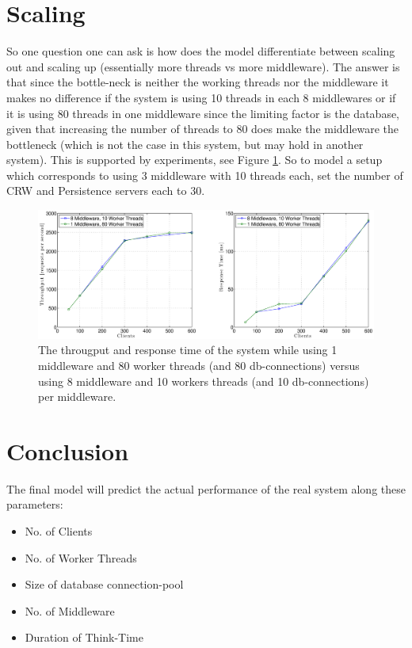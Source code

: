 \documentclass[a4paper, 11pt]{article}
\begin{document}
\section{Scaling}
	So one question one can ask is how does the model differentiate between scaling out and scaling up (essentially more threads vs more middleware). The answer is that since the bottle-neck is neither the working threads nor the middleware it makes no difference if the system is using 10 threads in each 8 middlewares or if it is using 80 threads in one middleware since the limiting factor is the database, given that increasing the number of threads to 80 does make the middleware the bottleneck (which is not the case in this system, but may hold in another system). This is  supported by experiments, see Figure \ref{fig:1mw80th-vs-8mw10th}. So to model a setup which corresponds to using 3 middleware with 10 threads each, set the number of CRW and Persistence servers each to 30.

	\FloatBarrier
	\begin{figure}[ch!]
		\centering
			\includegraphics[width=1\linewidth,keepaspectratio]{1mw80th-vs-8mw10th}
		\caption{The througput and response time of the system while using 1 middleware and 80 worker threads (and 80 db-connections) versus using 8 middleware and 10 workers threads (and 10 db-connections) per middleware.}
		\label{fig:1mw80th-vs-8mw10th}
	\end{figure}
	\FloatBarrier


\section{Conclusion}
The final model will predict the actual performance of the real system along these parameters:
\begin{itemize}
	\item No. of Clients
	\item No. of Worker Threads
	\item Size of database connection-pool
	\item No. of Middleware
	\item Duration of Think-Time
\end{itemize}
\end{document}
